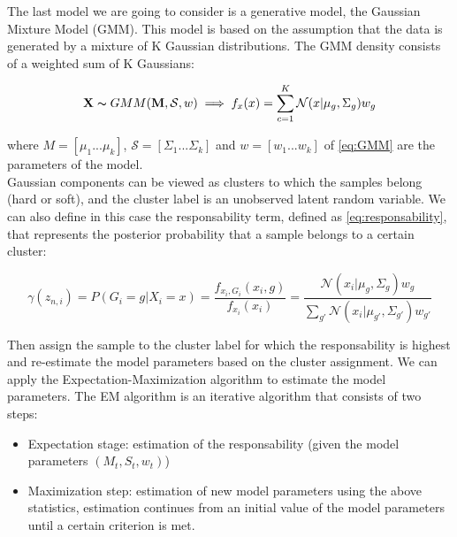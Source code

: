 The last model we are going to consider is a generative model, the Gaussian Mixture Model (GMM).
This model is based on the assumption that the data is generated by a mixture of K Gaussian distributions.
The GMM density consists of a weighted sum of K Gaussians:

\begin{equation}
    \mathbf{X}\thicksim  GMM(\mathbf{M} ,\mathcal{S},w)\implies f_x(x)=\sum_{c=1}^{K}\mathcal{N}(x|\mu_g,\Sigma_g)w_g
    \label{eq:GMM}
\end{equation}

where \( M=[\mu_1...\mu_k]\), \(\mathcal{S}=[\Sigma_1...\Sigma_k]\) and \(w=[w_1...w_k]\) of \autoref{eq:GMM} are the parameters of the model.\\
Gaussian components can be viewed as clusters to which the samples belong (hard or soft), and the cluster label is an unobserved latent random variable.
We can also define in this case the responsability term, defined as \autoref{eq:responsability}, that represents the
posterior probability that a sample belongs to a certain cluster:

\begin{equation}
    \gamma(z_{n,i})=P(G_i=g| X_i=x)=\frac{f_{x_i,G_i}(x_i,g)}{f_{x_i}(x_i)}=\frac{\mathcal{N}(x_i|\mu_g,\Sigma_g)w_g}{\sum_{g'}\mathcal{N}(x_i|\mu_{g'},\Sigma_{g'})w_{g'}}
    \label{eq:responsability}
\end{equation}

Then assign the sample to the cluster label for which the responsability is highest and re-estimate the model parameters based on the cluster assignment.
We can apply the Expectation-Maximization algorithm to estimate the model parameters.
The EM algorithm is an iterative algorithm that consists of two steps:
\begin{itemize}
    \item Expectation stage: estimation of the responsability (given the model parameters \((M_t,S_t,w_t)\))
    \item Maximization step: estimation of new model parameters using the above statistics, estimation continues from an
    initial value of the model parameters until a certain criterion is met.
\end{itemize}

